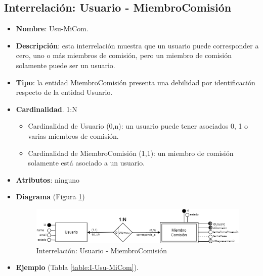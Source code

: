 \subsection{Interrelación: Usuario - MiembroComisión}
\begin{itemize}
    \item \textbf{Nombre}: Usu-MiCom.
    \item \textbf{Descripción}: esta interrelación muestra que un usuario puede corresponder a cero, uno o más miembros de comisión, pero un miembro de comisión solamente puede ser un usuario.
    \item \textbf{Tipo}: la entidad MiembroComisión presenta una debilidad por identificación respecto de la entidad Usuario.
    \item \textbf{Cardinalidad}. 1:N
    \begin{itemize}
        \item Cardinalidad de Usuario (0,n): un usuario puede tener asociados 0, 1 o varias miembros de comisión.
        \item Cardinalidad de MiembroComisión (1,1): un miembro de comisión solamente está asociado a un usuario.
    \end{itemize}
    \item \textbf{Atributos}: ninguno
    \item \textbf{Diagrama} (Figura \ref{fig:I-Usu-MiCom}) 
    \begin{figure}[H]
        \centering
        \includegraphics[scale=0.7]{img/diagramas/EER/I-Usu-MiCom}
        \caption{Interrelación: Usuario - MiembroComisión}
        \label{fig:I-Usu-MiCom}
    \end{figure}
    
    \item \textbf{Ejemplo} (Tabla \ref{table:I-Usu-MiCom}).


\end{itemize}
